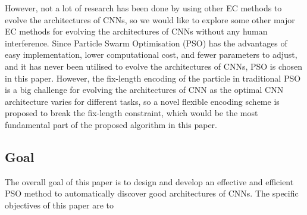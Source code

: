 \documentclass[conference]{IEEEtran}
\begin{document}

However, not a lot of research has been done by using other EC methods to evolve the architectures of CNNs, so we would like to explore some other major EC methods for evolving the architectures of CNNs without any human interference. Since Particle Swarm Optimisation (PSO) has the advantages of easy implementation, lower computational cost, and fewer parameters to adjust, and it has never been utilised to evolve the architectures of CNNs, PSO is chosen in this paper. However, the fix-length encoding of the particle in traditional PSO is a big challenge for evolving the architectures of CNN as the optimal CNN architecture varies for different tasks, so a novel flexible encoding scheme is proposed to break the fix-length constraint, which would be the most fundamental part of the proposed algorithm in this paper. 


\subsection{Goal}
The overall goal of this paper is to design and develop an effective and efficient PSO method to automatically discover good architectures of CNNs. The specific objectives of this paper are to
\end{document}
